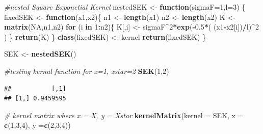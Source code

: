 \documentclass[
]{article}
\newenvironment{Shaded}{\begin{snugshade}}{\end{snugshade}}
\newcommand{\AttributeTok}[1]{\textcolor[rgb]{0.13,0.29,0.53}{#1}}
\newcommand{\CommentTok}[1]{\textcolor[rgb]{0.56,0.35,0.01}{\textit{#1}}}
\newcommand{\ConstantTok}[1]{\textcolor[rgb]{0.56,0.35,0.01}{#1}}
\newcommand{\ControlFlowTok}[1]{\textcolor[rgb]{0.13,0.29,0.53}{\textbf{#1}}}
\newcommand{\DecValTok}[1]{\textcolor[rgb]{0.00,0.00,0.81}{#1}}
\newcommand{\FloatTok}[1]{\textcolor[rgb]{0.00,0.00,0.81}{#1}}
\newcommand{\FunctionTok}[1]{\textcolor[rgb]{0.13,0.29,0.53}{\textbf{#1}}}
\newcommand{\NormalTok}[1]{#1}
\newcommand{\OtherTok}[1]{\textcolor[rgb]{0.56,0.35,0.01}{#1}}
\newcommand{\SpecialCharTok}[1]{\textcolor[rgb]{0.81,0.36,0.00}{\textbf{#1}}}
\newcommand{\StringTok}[1]{\textcolor[rgb]{0.31,0.60,0.02}{#1}}
\begin{document}
\begin{Shaded}
\begin{Highlighting}[]
\CommentTok{\#nested Square Exponetial Kernel}
\NormalTok{nestedSEK }\OtherTok{\textless{}{-}} \ControlFlowTok{function}\NormalTok{(}\AttributeTok{sigmaF=}\DecValTok{1}\NormalTok{,}\AttributeTok{l=}\DecValTok{3}\NormalTok{) \{}
\NormalTok{  fixedSEK }\OtherTok{\textless{}{-}} \ControlFlowTok{function}\NormalTok{(x1,x2)\{}
\NormalTok{    n1 }\OtherTok{\textless{}{-}} \FunctionTok{length}\NormalTok{(x1)}
\NormalTok{    n2 }\OtherTok{\textless{}{-}} \FunctionTok{length}\NormalTok{(x2)}
\NormalTok{    K }\OtherTok{\textless{}{-}} \FunctionTok{matrix}\NormalTok{(}\ConstantTok{NA}\NormalTok{,n1,n2)}
    \ControlFlowTok{for}\NormalTok{ (i }\ControlFlowTok{in} \DecValTok{1}\SpecialCharTok{:}\NormalTok{n2)\{}
\NormalTok{      K[,i] }\OtherTok{\textless{}{-}}\NormalTok{ sigmaF}\SpecialCharTok{\^{}}\DecValTok{2}\SpecialCharTok{*}\FunctionTok{exp}\NormalTok{(}\SpecialCharTok{{-}}\FloatTok{0.5}\SpecialCharTok{*}\NormalTok{( (x1}\SpecialCharTok{{-}}\NormalTok{x2[i])}\SpecialCharTok{/}\NormalTok{l)}\SpecialCharTok{\^{}}\DecValTok{2}\NormalTok{ )}
\NormalTok{    \}}
    \FunctionTok{return}\NormalTok{(K)}
\NormalTok{  \}}
  \FunctionTok{class}\NormalTok{(fixedSEK) }\OtherTok{\textless{}{-}} \StringTok{\textquotesingle{}kernel\textquotesingle{}}
  \FunctionTok{return}\NormalTok{(fixedSEK)}
\NormalTok{\}}

\NormalTok{SEK }\OtherTok{\textless{}{-}} \FunctionTok{nestedSEK}\NormalTok{()}

\CommentTok{\#testing kernal function for x=1, xstar=2}
\FunctionTok{SEK}\NormalTok{(}\DecValTok{1}\NormalTok{,}\DecValTok{2}\NormalTok{)}
\end{Highlighting}
\end{Shaded}

\begin{verbatim}
##           [,1]
## [1,] 0.9459595
\end{verbatim}

\begin{Shaded}
\begin{Highlighting}[]
\CommentTok{\# kernel matrix where x = X, y = Xstar}
\FunctionTok{kernelMatrix}\NormalTok{(}\AttributeTok{kernel =}\NormalTok{ SEK, }\AttributeTok{x =} \FunctionTok{c}\NormalTok{(}\DecValTok{1}\NormalTok{,}\DecValTok{3}\NormalTok{,}\DecValTok{4}\NormalTok{), }\AttributeTok{y =}\FunctionTok{c}\NormalTok{(}\DecValTok{2}\NormalTok{,}\DecValTok{3}\NormalTok{,}\DecValTok{4}\NormalTok{))}
\end{Highlighting}
\end{Shaded}
\end{document}
